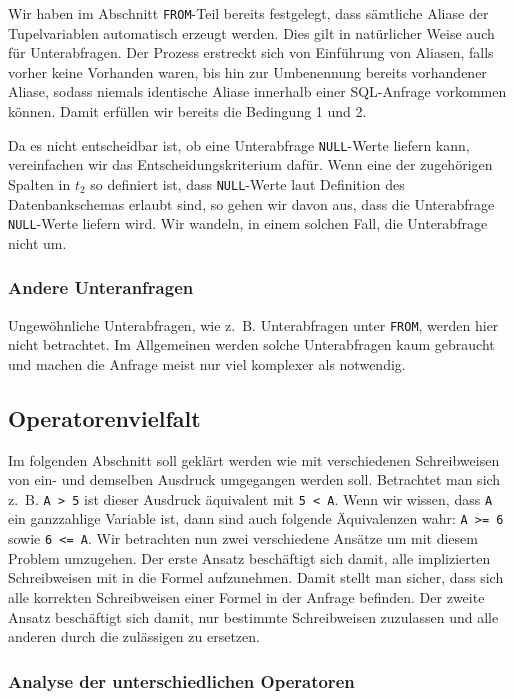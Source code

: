 Wir haben im Abschnitt \verb|FROM|-Teil bereits festgelegt, dass sämtliche Aliase der Tupelvariablen automatisch erzeugt werden. Dies gilt in natürlicher Weise auch für Unterabfragen. Der Prozess erstreckt sich von Einführung von Aliasen, falls vorher keine Vorhanden waren, bis hin zur Umbenennung bereits vorhandener Aliase, sodass niemals identische Aliase innerhalb einer SQL-Anfrage vorkommen können. Damit erfüllen wir bereits die Bedingung 1 und 2. 

Da es nicht entscheidbar ist, ob eine Unterabfrage \verb|NULL|-Werte liefern kann, vereinfachen wir das Entscheidungskriterium dafür. Wenn eine der zugehörigen Spalten in $t_2$ so definiert ist, dass \verb|NULL|-Werte laut Definition des Datenbankschemas erlaubt sind, so gehen wir davon aus, dass die Unterabfrage \verb|NULL|-Werte liefern wird. Wir wandeln, in einem solchen Fall, die Unterabfrage nicht um.

\subsubsection{Andere Unteranfragen}

Ungewöhnliche Unterabfragen, wie \mbox{z. B.} Unterabfragen unter \verb|FROM|, werden hier nicht betrachtet. Im Allgemeinen werden solche Unterabfragen kaum gebraucht und machen die Anfrage meist nur viel komplexer als notwendig.

\subsection{Operatorenvielfalt}

Im folgenden Abschnitt soll geklärt werden wie mit verschiedenen Schreibweisen von ein- und demselben Ausdruck umgegangen werden soll. Betrachtet man sich \mbox{z. B.} \verb|A > 5| ist dieser Ausdruck äquivalent mit \verb|5 < A|. Wenn wir wissen, dass \verb|A| ein ganzzahlige Variable ist, dann sind auch folgende Äquivalenzen wahr: \verb|A >= 6| sowie \verb|6 <= A|. Wir betrachten nun zwei verschiedene Ansätze um mit diesem Problem umzugehen. Der erste Ansatz beschäftigt sich damit, alle implizierten Schreibweisen mit in die Formel aufzunehmen. Damit stellt man sicher, dass sich alle korrekten Schreibweisen einer Formel in der Anfrage befinden. Der zweite Ansatz beschäftigt sich damit, nur bestimmte Schreibweisen zuzulassen und alle anderen durch die zulässigen zu ersetzen.

\subsubsection{Analyse der unterschiedlichen Operatoren}

